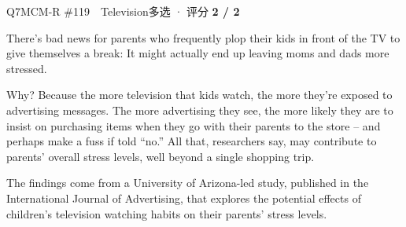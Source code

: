 \begin{qblock}{Q7\quad MCM-R \#119\ \ Television}{多选 · 评分 \textcolor{cAccent}{\bfseries 2 / 2}}
\begin{promptbox}
There's bad news for parents who frequently plop their kids in front of the TV to give themselves a break: It might actually end up leaving moms and dads more stressed.

Why? Because the more television that kids watch, the more they're exposed to advertising messages. The more advertising they see, the more likely they are to insist on purchasing items when they go with their parents to the store -- and perhaps make a fuss if told ``no.'' All that, researchers say, may contribute to parents' overall stress levels, well beyond a single shopping trip.

The findings come from a University of Arizona-led study, published in the International Journal of Advertising, that explores the potential effects of children's television watching habits on their parents' stress levels.


\end{promptbox}
\end{qblock}
